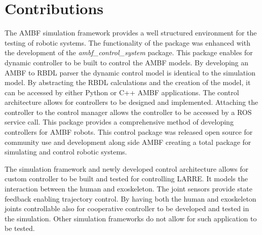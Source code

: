 \section{Contributions}

The AMBF simulation framework provides a well structured environment for the testing of robotic systems. The functionality of the package was enhanced with the development of the \textit{ambf\_control\_system} package. This package enables for dynamic controller to be built to control the AMBF models. By developing an AMBF to RBDL parser the dynamic control model is identical to the simulation model. By abstracting the RBDL calculations and the creation of the model, it can be accessed by either Python or C++ AMBF applications. The control architecture allows for controllers to be designed and implemented. Attaching the controller to the control manager allows the controller to be accessed by a ROS service call. This package provides a comprehensive method of developing controllers for AMBF robots. This control package was released open source for community use and development along side AMBF creating a total package for simulating and control robotic systems.   

The simulation framework and newly developed control architecture allows for custom controller to be built and tested for controlling LARRE. It models the interaction between the human and exoskeleton. The joint sensors provide state feedback enabling trajectory control. By having both the human and exoskeleton joints controllable also for cooperative controller to be developed and tested in the simulation. Other simulation frameworks do not allow for such application to be tested.  

